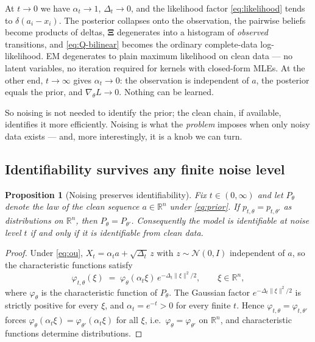 \documentclass[11pt]{article}
\newtheorem{proposition}{Proposition}
\theoremstyle{remark}
\newcommand{\R}{\mathbb{R}}
\newcommand{\Normal}{\mathcal{N}}
\newcommand{\Xibf}{\bm{\Xi}}
\begin{document}
At $t \to 0$ we have $\alpha_t \to 1$, $\Delta_t \to 0$, and the likelihood
factor \eqref{eq:likelihood} tends to $\delta(a_i - x_i)$. The posterior
collapses onto the observation, the pairwise beliefs become products of deltas,
$\Xibf$ degenerates into a histogram of \emph{observed} transitions, and
\eqref{eq:Q-bilinear} becomes the ordinary complete-data log-likelihood. EM
degenerates to plain maximum likelihood on clean data --- no latent variables,
no iteration required for kernels with closed-form MLEs. At the other end,
$t \to \infty$ gives $\alpha_t \to 0$: the observation is independent of $a$,
the posterior equals the prior, and $\nabla_\theta L \to 0$. Nothing can be
learned.

So noising is not needed to identify the prior; the clean chain, if available,
identifies it more efficiently. Noising is what the \emph{problem} imposes when
only noisy data exists --- and, more interestingly, it is a knob we can turn.

\subsection{Identifiability survives any finite noise level}

\begin{proposition}[Noising preserves identifiability]
\label{prop:ident}
Fix $t \in (0,\infty)$ and let $P_\theta$ denote the law of the clean sequence
$a \in \R^n$ under \eqref{eq:prior}. If $p_{t,\theta} = p_{t,\theta'}$ as
distributions on $\R^n$, then $P_\theta = P_{\theta'}$. Consequently the model
is identifiable at noise level $t$ if and only if it is identifiable from clean
data.
\end{proposition}

\begin{proof}
Under \eqref{eq:ou}, $X_t = \alpha_t a + \sqrt{\Delta_t}\, z$ with
$z \sim \Normal(0,I)$ independent of $a$, so the characteristic functions
satisfy
\begin{equation}
  \varphi_{t,\theta}(\xi)
  \;=\; \varphi_\theta(\alpha_t \xi)\, e^{-\Delta_t \|\xi\|^2 / 2},
  \qquad \xi \in \R^n,
\end{equation}
where $\varphi_\theta$ is the characteristic function of $P_\theta$. The
Gaussian factor $e^{-\Delta_t\|\xi\|^2/2}$ is strictly positive for every
$\xi$, and $\alpha_t = e^{-t} > 0$ for every finite $t$. Hence
$\varphi_{t,\theta} = \varphi_{t,\theta'}$ forces
$\varphi_\theta(\alpha_t\xi) = \varphi_{\theta'}(\alpha_t\xi)$ for all $\xi$,
i.e.\ $\varphi_\theta = \varphi_{\theta'}$ on $\R^n$, and characteristic
functions determine distributions.
\end{proof}
\end{document}
